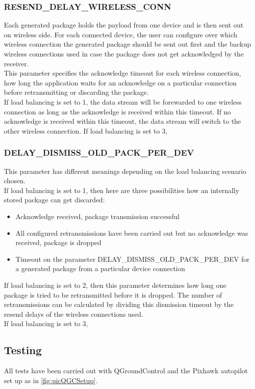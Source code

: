 \subsubsection{RESEND\_DELAY\_WIRELESS\_CONN}
Each generated package holds the payload from one device and is then sent out on wireless side. For each connected device, the user can configure over which wireless connection the generated package should be sent out first and the backup wireless connections used in case the package does not get acknowledged by the receiver.\\
This parameter specifies the acknowledge timeout for each wireless connection, how long the application waits for an acknowledge on a particular connection before retransmitting or discarding the package.\\
If load balancing is set to 1, the data stream will be forewarded to one wireless connection as long as the acknowledge is received within this timeout. If no acknowledge is received within this timeout, the data stream will switch to the other wireless connection.
If load balancing is set to 3, 
%
\subsubsection{DELAY\_DISMISS\_OLD\_PACK\_PER\_DEV}
This parameter has different meanings depending on the load balancing scenario chosen.\\
If load balancing is set to 1, then here are three possibilities how an internally stored package can get discarded:
\begin{itemize}
    \item Acknowledge received, package transmission successful
    \item All configured retransmissions have been carried out but no acknowledge was received, package is dropped
    \item Timeout on the parameter DELAY\_DISMISS\_OLD\_PACK\_PER\_DEV for a generated package from a particular device connection
\end{itemize}
If load balancing is set to 2, then this parameter determines how long one package is tried to be retransmitted before it is dropped. The number of retransmissions can be calculated by dividing this dismission timeout by the resend delays of the wireless connections used.\\
If load balancing is set to 3, 
%
%
%
%
%
%
\subsection{Testing}
All tests have been carried out with QGroundControl and the Pixhawk autopilot set up as in \autoref{fig:picQGCSetup}.
%
